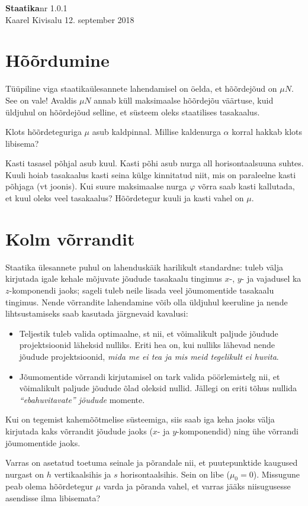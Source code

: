 \documentclass[a4paper,11pt,twocolumn]{article}
\begin{document}
{\huge \textbf{Staatika}\hfill \normalsize {nr 1.0.1}} \\
{Kaarel Kivisalu \hfill 12. september 2018}

\section{Hõõrdumine}
Tüüpiline viga staatikaülesannete lahendamisel on öelda, et hõõrdejõud on $\mu N$. See on vale! Avaldis $\mu N$ annab küll maksimaalse hõõrdejõu väärtuse, kuid üldjuhul on hõõrdejõud selline, et süsteem oleks staatilises tasakaalus.
\begin{question}
Klots hõõrdeteguriga $\mu$ asub kaldpinnal. Millise kaldenurga $\alpha$ korral hakkab klots libisema?
\end{question}
\begin{question}[Lahtine 2006, V7][sta1][5cm]
	Kasti tasasel põhjal asub kuul. Kasti põhi asub nurga all horisontaalsuuna suhtes. Kuuli hoiab tasakaalus kasti seina külge kinnitatud niit, mis on paraleelne kasti põhjaga (vt joonis). Kui suure maksimaalse nurga $ \varphi $ võrra saab kasti kallutada, et kuul oleks veel tasakaalus? Hõõrdetegur kuuli ja kasti vahel on $ \mu $.
\end{question}	

\section{Kolm võrrandit}
Staatika ülesannete puhul on lahenduskäik harilikult standardne: tuleb välja kirjutada igale kehale mõjuvate jõudude tasakaalu tingimus $x$-, $y$- ja vajadusel ka $z$-komponendi jaoks; sageli tuleb neile lisada veel jõumomentide tasakaalu tingimus. Nende võrrandite lahendamine  võib olla üldjuhul keeruline ja nende lihtsustamiseks saab kasutada järgnevaid kavalusi:
\begin{itemize}
	\item Teljestik tuleb valida optimaalne, st nii, et võimalikult paljude jõudude projektsioonid läheksid nulliks. Eriti hea on, kui nulliks lähevad nende jõudude projektsioonid, \textit{mida me ei tea ja mis meid tegelikult ei huvita}.
	\item Jõumomentide võrrandi kirjutamisel on tark valida pöörlemistelg nii, et võimalikult paljude jõudude õlad oleksid nullid. Jällegi on eriti tõhus nullida \textit{“ebahuvitavate” jõudude} momente.
\end{itemize}
Kui on tegemist kahemõõtmelise süsteemiga, siis saab iga keha jaoks välja kirjutada kaks võrrandit jõudude jaoks ($ x $- ja $ y $-komponendid) ning ühe võrrandi jõumomentide jaoks.
\begin{question}
	Varras on asetatud toetuma seinale ja põrandale nii, et puutepunktide kaugused nurgast on $h$ vertikaalsihis ja $s$ horisontaalsihis. Sein on libe ($\mu_0=0$). Missugune peab olema hõõrdetegur $\mu$ varda ja põranda vahel, et varras jääks niisugusesse asendisse ilma libisemata? 
\end{question}
\end{document}
